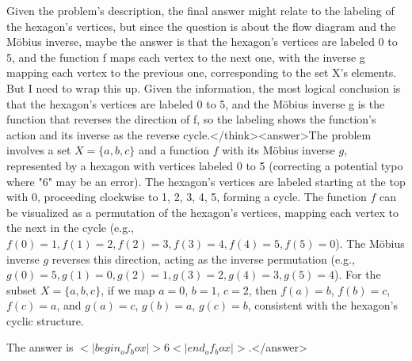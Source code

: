 Given the problem's description, the final answer might relate to the labeling of the hexagon's vertices, but since the question is about the flow diagram and the Möbius inverse, maybe the answer is that the hexagon's vertices are labeled 0 to 5, and the function f maps each vertex to the next one, with the inverse g mapping each vertex to the previous one, corresponding to the set X's elements. But I need to wrap this up. Given the information, the most logical conclusion is that the hexagon's vertices are labeled 0 to 5, and the Möbius inverse g is the function that reverses the direction of f, so the labeling shows the function's action and its inverse as the reverse cycle.</think><answer>The problem involves a set \( X = \{a, b, c\} \) and a function \( f \) with its Möbius inverse \( g \), represented by a hexagon with vertices labeled 0 to 5 (correcting a potential typo where "6" may be an error). The hexagon's vertices are labeled starting at the top with 0, proceeding clockwise to 1, 2, 3, 4, 5, forming a cycle. The function \( f \) can be visualized as a permutation of the hexagon's vertices, mapping each vertex to the next in the cycle (e.g., \( f(0) = 1, f(1) = 2, f(2) = 3, f(3) = 4, f(4) = 5, f(5) = 0 \)). The Möbius inverse \( g \) reverses this direction, acting as the inverse permutation (e.g., \( g(0) = 5, g(1) = 0, g(2) = 1, g(3) = 2, g(4) = 3, g(5) = 4 \)). For the subset \( X = \{a, b, c\} \), if we map \( a = 0 \), \( b = 1 \), \( c = 2 \), then \( f(a) = b \), \( f(b) = c \), \( f(c) = a \), and \( g(a) = c \), \( g(b) = a \), \( g(c) = b \), consistent with the hexagon's cyclic structure.  

The answer is \(<|begin_of_box|>6<|end_of_box|>\).</answer>